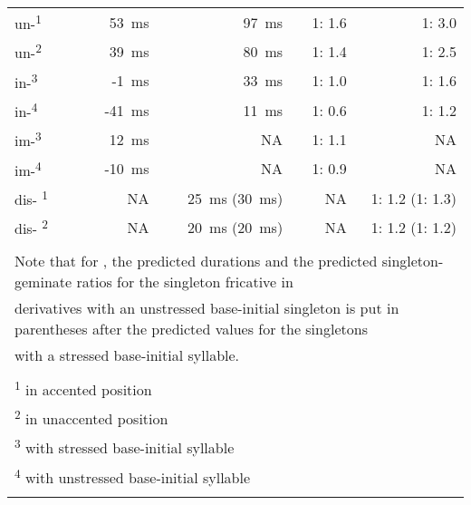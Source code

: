 \begin{table}
{\begin{tabular} {lrrrr}
				\midrule			
				un-\textsuperscript{1}& 53~ms & 97~ms   &  1: 1.6&1: 3.0\\ 
				un-\textsuperscript{2}& 39~ms & 80~ms   & 1: 1.4&1: 2.5\\ 
				
				in-\textsuperscript{3}&-1~ms &33~ms&1: 1.0&1: 1.6\\ 
				in-\textsuperscript{4}&-41~ms &11~ms&  1: 0.6& 1: 1.2\\ 
				
				im-\textsuperscript{3}&12~ms &NA  &  1: 1.1&NA \\ 
				im-\textsuperscript{4}&-10~ms &NA  & 1: 0.9 & NA\\ 
				
				dis- \textsuperscript{1}&NA & 25~ms  (30~ms)&NA &1: 1.2 (1: 1.3)   \\
				dis- \textsuperscript{2}&NA & 20~ms  (20~ms)& NA& 1: 1.2 (1: 1.2) \\
				
				
				\midrule
				\\
				\multicolumn{5}{l}{ \footnotesize{Note that for \prefix{dis}, the predicted durations and the predicted singleton-geminate ratios for the singleton fricative in}}\\
				\multicolumn{5}{l}{ \footnotesize{derivatives with an unstressed base-initial singleton is put in parentheses after the predicted values for the singletons}}\\
				\multicolumn{5}{l}{ \footnotesize{with a stressed base-initial syllable.}}\\
				\\				
				\multicolumn{5}{l}{\textsuperscript{1} \footnotesize{in accented position}}\\
				\multicolumn{5}{l}{\textsuperscript{2} \footnotesize{in unaccented position}}\\
				\multicolumn{5}{l}{\textsuperscript{3} \footnotesize{with stressed base-initial syllable}}\\
				\multicolumn{5}{l}{\textsuperscript{4} \footnotesize{with unstressed base-initial syllable}}\\

			\lspbottomrule 
			\end{tabular}
		}
	
	
	
	
\end{table}




